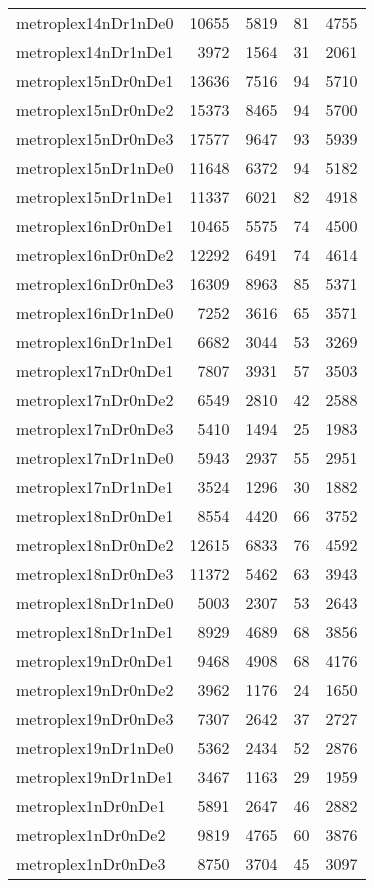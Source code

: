 \begin{longtable}{lrrrr}
metroplex14nDr1nDe0 & 10655 & 5819 & 81 & 4755 \\
metroplex14nDr1nDe1 & 3972 & 1564 & 31 & 2061 \\
metroplex15nDr0nDe1 & 13636 & 7516 & 94 & 5710 \\
metroplex15nDr0nDe2 & 15373 & 8465 & 94 & 5700 \\
metroplex15nDr0nDe3 & 17577 & 9647 & 93 & 5939 \\
metroplex15nDr1nDe0 & 11648 & 6372 & 94 & 5182 \\
metroplex15nDr1nDe1 & 11337 & 6021 & 82 & 4918 \\
metroplex16nDr0nDe1 & 10465 & 5575 & 74 & 4500 \\
metroplex16nDr0nDe2 & 12292 & 6491 & 74 & 4614 \\
metroplex16nDr0nDe3 & 16309 & 8963 & 85 & 5371 \\
metroplex16nDr1nDe0 & 7252 & 3616 & 65 & 3571 \\
metroplex16nDr1nDe1 & 6682 & 3044 & 53 & 3269 \\
metroplex17nDr0nDe1 & 7807 & 3931 & 57 & 3503 \\
metroplex17nDr0nDe2 & 6549 & 2810 & 42 & 2588 \\
metroplex17nDr0nDe3 & 5410 & 1494 & 25 & 1983 \\
metroplex17nDr1nDe0 & 5943 & 2937 & 55 & 2951 \\
metroplex17nDr1nDe1 & 3524 & 1296 & 30 & 1882 \\
metroplex18nDr0nDe1 & 8554 & 4420 & 66 & 3752 \\
metroplex18nDr0nDe2 & 12615 & 6833 & 76 & 4592 \\
metroplex18nDr0nDe3 & 11372 & 5462 & 63 & 3943 \\
metroplex18nDr1nDe0 & 5003 & 2307 & 53 & 2643 \\
metroplex18nDr1nDe1 & 8929 & 4689 & 68 & 3856 \\
metroplex19nDr0nDe1 & 9468 & 4908 & 68 & 4176 \\
metroplex19nDr0nDe2 & 3962 & 1176 & 24 & 1650 \\
metroplex19nDr0nDe3 & 7307 & 2642 & 37 & 2727 \\
metroplex19nDr1nDe0 & 5362 & 2434 & 52 & 2876 \\
metroplex19nDr1nDe1 & 3467 & 1163 & 29 & 1959 \\
metroplex1nDr0nDe1 & 5891 & 2647 & 46 & 2882 \\
metroplex1nDr0nDe2 & 9819 & 4765 & 60 & 3876 \\
metroplex1nDr0nDe3 & 8750 & 3704 & 45 & 3097 \\

\end{longtable}
